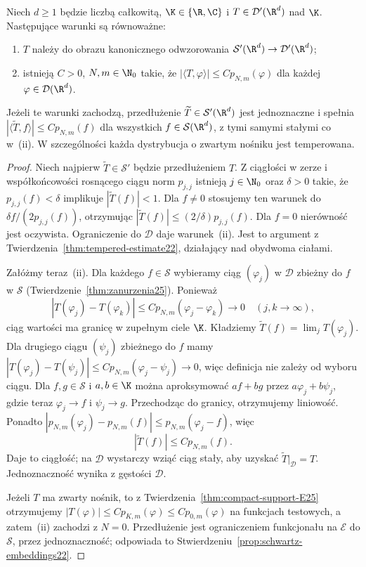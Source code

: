 \begin{twierdzenie}
\label{thm:temp-criterion25}
Niech $d\ge1$ będzie liczbą całkowitą, $\K\in\{\R,\C\}$
i $T\in\mathcal D'(\R^d)$ nad $\K$.
Następujące warunki są równoważne:
\begin{enumerate}[label=\textup{(\roman*)}]
\item $T$ należy do obrazu kanonicznego odwzorowania
$\mathcal S'(\R^d)\to\mathcal D'(\R^d)$;
\item istnieją $C>0$, $N,m\in\N_0$ takie, że
$|\langle T,\varphi\rangle|\le C p_{N,m}(\varphi)$
dla każdej $\varphi\in\mathcal D(\R^d)$.
\end{enumerate}
Jeżeli te warunki zachodzą, przedłużenie
$\widetilde T\in\mathcal S'(\R^d)$ jest jednoznaczne
i spełnia $|\langle\widetilde T,f\rangle|\le C p_{N,m}(f)$
dla wszystkich $f\in\mathcal S(\R^d)$, z tymi samymi
stałymi co w~\textup{(ii)}. W szczególności każda
dystrybucja o zwartym nośniku jest temperowana.
\end{twierdzenie}
\begin{proof}
Niech najpierw $\widetilde T\in\mathcal S'$ będzie
przedłużeniem $T$. Z ciągłości w zerze i współkońcowości
rosnącego ciągu norm $p_{j,j}$ istnieją $j\in\N_0$ oraz
$\delta>0$ takie, że $p_{j,j}(f)<\delta$ implikuje
$|\widetilde T(f)|<1$. Dla $f\ne0$ stosujemy ten warunek
do $\delta f/(2p_{j,j}(f))$, otrzymując
$|\widetilde T(f)|\le (2/\delta)p_{j,j}(f)$.
Dla $f=0$ nierówność jest oczywista. Ograniczenie
do $\mathcal D$ daje warunek~\textup{(ii)}.
Jest to argument z Twierdzenia~\ref{thm:tempered-estimate22},
działający nad obydwoma ciałami.

Załóżmy teraz~\textup{(ii)}. Dla każdego $f\in\mathcal S$
wybieramy ciąg $(\varphi_j)$ w $\mathcal D$ zbieżny do $f$
w $\mathcal S$ (Twierdzenie~\ref{thm:zanurzenia25}).
Ponieważ
\[
 |T(\varphi_j)-T(\varphi_k)|
 \le C p_{N,m}(\varphi_j-\varphi_k)\longrightarrow0
 \quad(j,k\to\infty),
\]
ciąg wartości ma granicę w zupełnym ciele $\K$.
Kładziemy $\widetilde T(f)=\lim_jT(\varphi_j)$.
Dla drugiego ciągu $(\psi_j)$ zbieżnego do $f$ mamy
$|T(\varphi_j)-T(\psi_j)|\le
C p_{N,m}(\varphi_j-\psi_j)\to0$, więc definicja nie zależy
od wyboru ciągu. Dla $f,g\in\mathcal S$ i $a,b\in\K$
można aproksymować $af+bg$ przez $a\varphi_j+b\psi_j$,
gdzie teraz $\varphi_j\to f$ i $\psi_j\to g$.
Przechodząc do granicy, otrzymujemy liniowość.
Ponadto $|p_{N,m}(\varphi_j)-p_{N,m}(f)|
\le p_{N,m}(\varphi_j-f)$, więc
\[
 |\widetilde T(f)|\le C p_{N,m}(f).
\]
Daje to ciągłość; na $\mathcal D$ wystarczy wziąć
ciąg stały, aby uzyskać $\widetilde T|_{\mathcal D}=T$.
Jednoznaczność wynika z gęstości $\mathcal D$.

Jeżeli $T$ ma zwarty nośnik, to z
Twierdzenia~\ref{thm:compact-support-E25} otrzymujemy
$|T(\varphi)|\le C p_{K,m}(\varphi)\le C p_{0,m}(\varphi)$
na funkcjach testowych, a zatem~\textup{(ii)} zachodzi z $N=0$.
Przedłużenie jest ograniczeniem funkcjonału na $\mathcal E$
do $\mathcal S$, przez jednoznaczność; odpowiada to
Stwierdzeniu~\ref{prop:schwartz-embeddings22}.
\end{proof}

